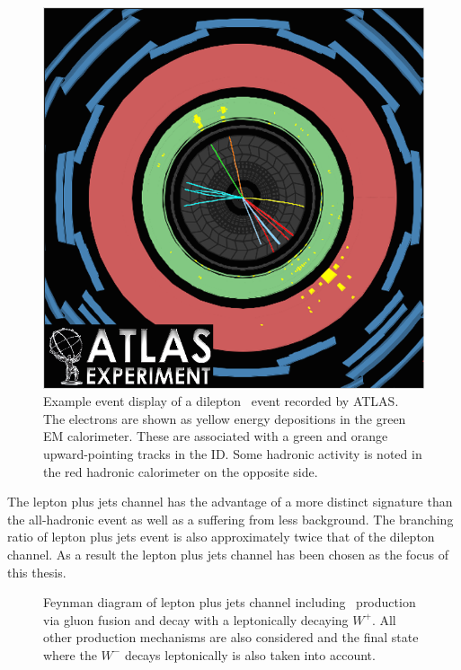\begin{figure}[p]
  \centering
  \includegraphics[height=0.65\textheight]{PartTopQuark/Diagrams/atlas-2010-063-fig_09.png}
  \caption{Example event display of a dilepton \ttbar\ event recorded by ATLAS\@. The electrons are shown as yellow energy depositions in the green EM calorimeter. These are associated with a green and orange upward-pointing tracks in the ID\@. Some hadronic activity is noted in the red hadronic calorimeter on the opposite side.}\label{fig:TopQuarkEventDisplay}
\end{figure}

The lepton plus jets channel has the advantage of a more distinct signature than the all-hadronic event as well as a suffering from less background. The branching ratio of lepton plus jets event is also approximately twice that of the dilepton channel. As a result the lepton plus jets channel has been chosen as the focus of this thesis.

\begin{figure}[htbp]
  \centering
  \begin{minipage}[][][t]{.60\textwidth}
  
  \end{minipage}
  \caption[Feynman diagram of lepton plus jets channel including \ttbar\ production via gluon fusion and decay with a leptonically decaying $W^{+}$.]{Feynman diagram of lepton plus jets channel including \ttbar\ production via gluon fusion and decay with a leptonically decaying $W^{+}$. All other production mechanisms are also considered and the final state where the $W^{-}$ decays leptonically is also taken into account.}\label{fig:TopQuarkFullLPlusJets}
\end{figure}

